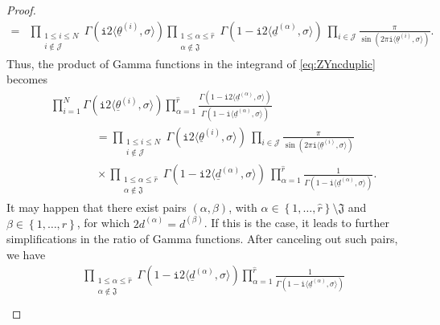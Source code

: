 \documentclass[10pt,a4paper]{amsart}
\newcommand{\ii}{\mathtt{i}}
\begin{document}
\begin{proof}
\begin{align*}
	= &\prod_{\substack{ 1 \le i \le N \\ i \notin \mathcal{J} }} \Gamma \left( \ii 2 \langle \underline{\theta}^{(i)}, \sigma \rangle \right)\prod_{\substack{ 1 \le \alpha \le \hat{r} \\ \alpha \notin \mathfrak{J}} } \Gamma \left( 1 - \ii 2 \langle\underline{d}^{(\alpha)}, \sigma \rangle \right) ~ \prod_{i \in \mathcal{J} } \frac{\pi}{\sin \left( 2 \pi \ii \langle \underline{\theta}^{(i)}, \sigma \rangle\right)} .
\end{align*}
Thus, the product of Gamma functions in the integrand of \eqref{eq:ZYncduplic} becomes 
\begin{equation*}
\begin{aligned}
    & \prod_{i=1}^{N} \Gamma \left( \ii 2 \langle \underline{\theta}^{(i)}, \sigma \rangle \right) \prod_{\alpha=1}^{\hat{r}} \frac{\Gamma \left( 1 - \ii 2 \langle\underline{d}^{(\alpha)}, \sigma \rangle \right) }{\Gamma \left( 1 - \ii \langle\underline{d}^{(\alpha)}, \sigma \rangle \right)}  \\
    & \qquad \qquad = \prod_{\substack{ 1 \le i \le N \\ i \notin \mathcal{J} }} \Gamma \left( \ii 2 \langle \underline{\theta}^{(i)}, \sigma \rangle \right) ~ \prod_{i \in \mathcal{J} } \frac{\pi}{\sin \left( 2 \pi \ii \langle \underline{\theta}^{(i)}, \sigma \rangle\right)} \\
    & \qquad \qquad \times \prod_{\substack{ 1 \le \alpha \le \hat{r} \\ \alpha \notin \mathfrak{J}} } \Gamma \left( 1 - \ii 2 \langle\underline{d}^{(\alpha)}, \sigma \rangle \right) ~ \prod_{\alpha=1}^{\hat{r}} \frac{1}{\Gamma \left( 1 - \ii \langle\underline{d}^{(\alpha)}, \sigma \rangle \right)} .
\end{aligned}
\end{equation*}
It may happen that there exist pairs $(\alpha, \beta)$, with $\alpha \in \left\{1, \dots, \hat{r} \right\}\setminus \mathfrak{J}$ and $\beta \in \left\{1, \dots, \hat{r} \right\}$, for which $2d^{(\alpha)}=d^{(\beta)}$. If this is the case, it leads to further simplifications in the ratio of Gamma functions. After canceling out such pairs, we have 
\begin{equation*}
\begin{aligned}
	&\prod_{\substack{ 1 \le \alpha \le \hat{r} \\ \alpha \notin \mathfrak{J}}} \Gamma \left( 1 - \ii 2 \langle\underline{d}^{(\alpha)}, \sigma \rangle \right) \prod_{\alpha=1}^{\hat{r}}\frac{1}{\Gamma \left( 1 - \ii \langle\underline{d}^{(\alpha)}, \sigma \rangle \right)} \\

\end{aligned}
\end{equation*}
\end{proof}
\end{document}
